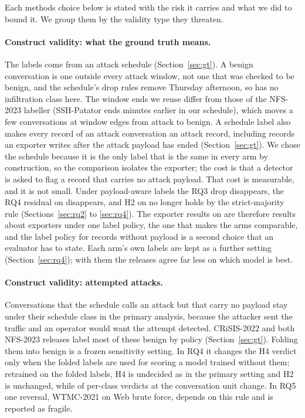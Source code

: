 
Each methods choice below is stated with the risk it carries and what we did to bound it. We group them by the validity type they threaten.

\paragraph{Construct validity: what the ground truth means.} The labels come from an attack schedule (Section~\ref{sec:gt}). A benign conversation is one outside every attack window, not one that was checked to be benign, and the schedule's drop rules remove Thursday afternoon, so \cicids{} has no infiltration class here. The window ends we reuse differ from those of the NFS-2023 labeller (SSH-Patator ends \NsshWindowEndMinutes{} minutes earlier in our schedule), which moves a few conversations at window edges from attack to benign. A schedule label also makes every record of an attack conversation an attack record, including records an exporter writes after the attack payload has ended (Section~\ref{sec:gt}). We chose the schedule because it is the only label that is the same in every arm by construction, so the comparison isolates the exporter; the cost is that a detector is asked to flag a record that carries no attack payload. That cost is measurable, and it is not small. Under payload-aware labels the RQ3 drop disappears, the RQ4 residual on \cicids{} disappears, and H2 on \cicids{} no longer holds by the strict-majority rule (Sections~\ref{sec:rq2} to \ref{sec:rq4}). The exporter results on \cicids{} are therefore results about exporters under one label policy, the one that makes the arms comparable, and the label policy for records without payload is a second choice that an evaluator has to state. Each arm's own labels are kept as a further setting (Section~\ref{sec:rq4}); with them the releases agree far less on which model is best.

\paragraph{Construct validity: attempted attacks.} Conversations that the schedule calls an attack but that carry no payload stay under their schedule class in the primary analysis, because the attacker sent the traffic and an operator would want the attempt detected. CRiSIS-2022 and both NFS-2023 releases label most of these benign by policy (Section~\ref{sec:gt}). Folding them into benign is a frozen sensitivity setting. In RQ4 it changes the H4 verdict only when the folded labels are used for scoring a model trained without them; retrained on the folded labels, H4 is undecided as in the primary setting and H2 is unchanged, while \RQfourFoldRetrainedClasses{} of \RQfourClassesOf{} per-class verdicts at the conversation unit change. In RQ5 one reversal, WTMC-2021 on Web brute force, depends on this rule and is reported as fragile.

